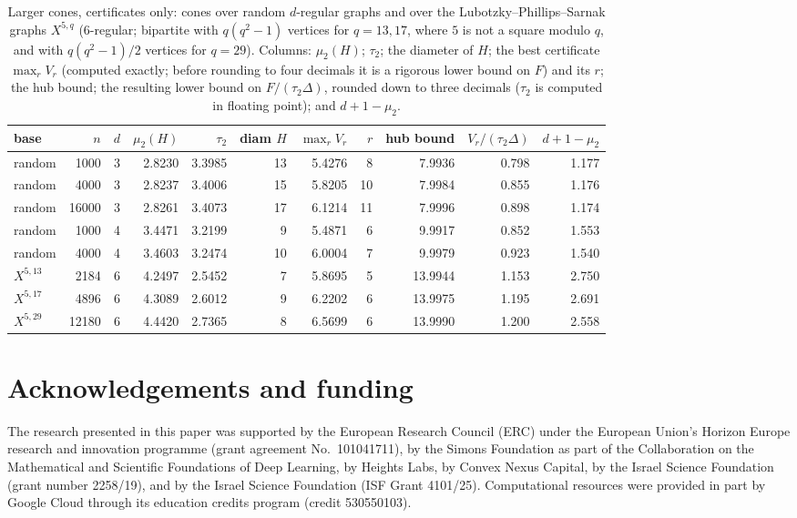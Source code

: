 \documentclass[11pt]{amsart}
\theoremstyle{definition}
\begin{document}
\begin{table}[ht]
\centering
\small
\setlength{\tabcolsep}{4.5pt}
\caption{Larger cones, certificates only: cones over random $d$-regular graphs and over the Lubotzky--Phillips--Sarnak graphs $X^{5,q}$ ($6$-regular; bipartite with $q(q^2-1)$ vertices for $q=13,17$, where $5$ is not a square modulo $q$, and with $q(q^2-1)/2$ vertices for $q=29$). Columns: $\mu_2(H)$; $\tau_2$; the diameter of $H$; the best certificate $\max_rV_r$ (computed exactly; before rounding to four decimals it is a rigorous lower bound on $F$) and its $r$; the hub bound; the resulting lower bound on $F/(\tau_2\Delta)$, rounded down to three decimals ($\tau_2$ is computed in floating point); and $d+1-\mu_2$.}\label{tab:big}
\begin{tabular}{lrrrrrrrrrr}
\toprule
base & $n$ & $d$ & $\mu_2(H)$ & $\tau_2$ & diam $H$ & $\max_rV_r$ & $r$ & hub bound & $V_r/(\tau_2\Delta)$ & $d+1-\mu_2$\\
\midrule
random & 1000 & 3 & 2.8230 & 3.3985 & 13 & 5.4276 & 8 & 7.9936 & 0.798 & 1.177\\
random & 4000 & 3 & 2.8237 & 3.4006 & 15 & 5.8205 & 10 & 7.9984 & 0.855 & 1.176\\
random & 16000 & 3 & 2.8261 & 3.4073 & 17 & 6.1214 & 11 & 7.9996 & 0.898 & 1.174\\
random & 1000 & 4 & 3.4471 & 3.2199 & 9 & 5.4871 & 6 & 9.9917 & 0.852 & 1.553\\
random & 4000 & 4 & 3.4603 & 3.2474 & 10 & 6.0004 & 7 & 9.9979 & 0.923 & 1.540\\
$X^{5,13}$ & 2184 & 6 & 4.2497 & 2.5452 & 7 & 5.8695 & 5 & 13.9944 & 1.153 & 2.750\\
$X^{5,17}$ & 4896 & 6 & 4.3089 & 2.6012 & 9 & 6.2202 & 6 & 13.9975 & 1.195 & 2.691\\
$X^{5,29}$ & 12180 & 6 & 4.4420 & 2.7365 & 8 & 6.5699 & 6 & 13.9990 & 1.200 & 2.558\\
\bottomrule
\end{tabular}
\end{table}

\section*{Acknowledgements and funding}
The research presented in this paper was supported by the European Research
Council (ERC) under the European Union's Horizon Europe research and
innovation programme (grant agreement No.~101041711), by the Simons
Foundation as part of the Collaboration on the Mathematical and Scientific
Foundations of Deep Learning, by Heights Labs, by Convex Nexus Capital, by
the Israel Science Foundation (grant number 2258/19), and by the Israel
Science Foundation (ISF Grant 4101/25). Computational resources were
provided in part by Google Cloud through its education credits program
(credit 530550103).
\end{document}
